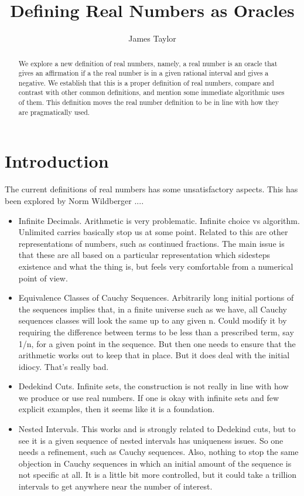 \documentclass[12pt]{article}
\title{Defining Real Numbers as Oracles}
\author{
  James Taylor
}
\begin{document}
\maketitle
\begin{abstract}
We explore a new definition of real numbers, namely, a real number is an oracle that gives an affirmation if a the real number is in a given rational interval and gives a negative. We establish that this is a proper definition of real numbers, compare and contrast with other common definitions, and mention some immediate algorithmic uses of them. This definition moves the real number definition to be in line with how they are pragmatically used. 
\end{abstract}





\section{Introduction}


The current definitions of real numbers has some unsatisfactory aspects. This
has been explored by Norm Wildberger ....

\begin{itemize}
    \item Infinite Decimals. Arithmetic is very problematic. Infinite choice vs
  algorithm. Unlimited carries basically stop us at some point. Related to
  this are other representations of numbers, such as continued fractions. The
  main issue is that these are all based on a particular representation which
  sidesteps existence and what the thing is, but feels very comfortable from a
  numerical point of view. 
  \item Equivalence Classes of Cauchy Sequences. Arbitrarily long initial portions
  of the sequences implies that, in a finite universe such as we have, all
  Cauchy sequences classes will look the same up to any given n. Could modify
  it by requiring the difference between terms to be less than a prescribed
  term, say 1/n, for a given point in the sequence. But then one needs to
  ensure that the arithmetic works out to keep that in place. But it does deal
  with the initial idiocy. That's really bad. 
  \item Dedekind Cuts. Infinite sets, the construction is not really in line with
  how we produce or use real numbers. If one is okay with infinite sets and
  few explicit examples, then it seems like it is a foundation. 
  \item Nested Intervals. This works and is strongly related to Dedekind cuts, but
  to see it is a given sequence of nested intervals has uniqueness issues. So
  one needs a refinement, such as Cauchy sequences. Also, nothing to stop the
  same objection in Cauchy sequences in which an initial amount of the
  sequence is not specific at all. It is a little bit more controlled, but it
  could take a trillion intervals to get anywhere near the number of interest.
\end{itemize}
\end{document}
